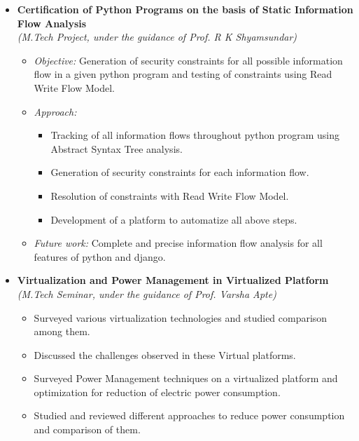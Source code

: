 \begin{itemize}
\item \textbf{Certification of Python Programs on the basis of Static Information Flow Analysis} \\
      \emph{(M.Tech Project, under the guidance of Prof. R K Shyamsundar)}  \\[-0.6cm]
      \begin{itemize}
  \item \textit{Objective:} Generation of security constraints for all possible information flow in a given python program and testing of constraints using Read Write Flow Model.\\[-0.5cm]
 	  	  
  \item \textit{Approach:} \\[-0.5cm]
   \begin{itemize}
 \item Tracking of all information flows throughout python program using Abstract Syntax Tree analysis.
 \item Generation of security constraints for each information flow.
 \item Resolution of constraints with Read Write Flow Model.
 \item Development of a platform to automatize all above steps. \\[-0.5cm]
   \end{itemize}
  \item \textit{Future work:} 
  Complete and precise information flow analysis for all features of python and django.\\[-0.5cm]
  	        \end{itemize}
\item \textbf{Virtualization and Power Management in Virtualized Platform} \\
\emph{(M.Tech Seminar, under the guidance of Prof. Varsha Apte)} \\[-0.6cm]
\begin{itemize}
	\item Surveyed various virtualization technologies and studied comparison among them. \\[-0.5cm]
	\item Discussed the challenges observed in these Virtual platforms. \\[-0.5cm]
	\item Surveyed Power Management techniques on a virtualized platform and optimization for reduction of electric power consumption. \\[-0.5cm]
	\item Studied and reviewed different approaches to reduce power consumption and comparison of them.
\end{itemize}


\end{itemize}
